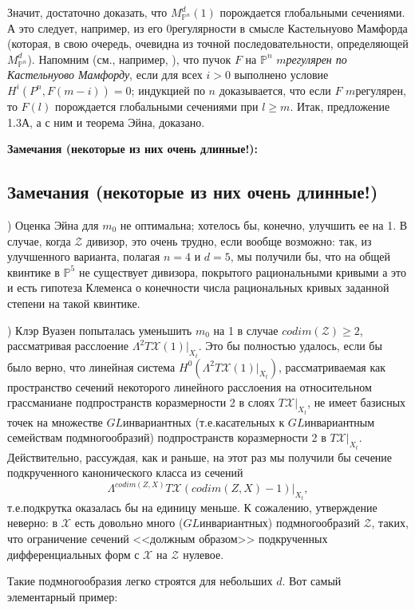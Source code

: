 Значит, достаточно доказать, что $M^d_{\mathbb{P}^n}(1)$ порождается
глобальными сечениями. А это следует, например, из его $0$регулярности
в смысле Кастельнуово Мамфорда (которая, в свою очередь, очевидна из
точной последовательности, определяющей $M^d_{\mathbb{P}^n}$). Напомним
(см., например, \cite{M}), что пучок $F$ на $\mathbb{P}^n$ \emph{$m$регулярен по
Кастельнуово Мамфорду}, если для всех $i>0$ выполнено условие
$H^i(P^n, F(m-i))=0$; индукцией по $n$ доказывается, что если $F$
$m$регулярен, то $F(l)$ порождается
глобальными сечениями при $l\geq m$. Итак, предложение 1.3А, а с ним и
теорема Эйна, доказано.


\medskip
{\bf Замечания (некоторые из них очень длинные!):}
\subsection*{Замечания (некоторые из них очень длинные!)
}

)
Оценка Эйна для $m_0$ не оптимальна; хотелось бы, конечно, улучшить ее на 1.
В случае, когда $\mathcal{Z}$ дивизор, это очень трудно, если вообще возможно:
так, из улучшенного варианта, полагая $n=4$ и $d=5$, мы получили бы, что
на общей квинтике в $\mathbb{P}^5$ не существует дивизора, покрытого рациональными
кривыми а это и есть гипотеза Клеменса о конечности числа рациональных
кривых заданной степени на такой квинтике.

)
Клэр Вуазен попыталась уменьшить $m_0$ на 1 в случае
$codim(\mathcal{Z})\geq 2$, рассматривая расслоение
$\Lambda^2T\mathcal{X}(1)|_{X_t}$. Это бы полностью удалось, если бы было
верно, что линейная система $H^0(\Lambda^2T\mathcal{X}(1)|_{X_t})$,
рассматриваемая как пространство сечений некоторого линейного расслоения
на относительном грассманиане подпространств коразмерности 2 в слоях
$T\mathcal{X}|_{X_t}$, не имеет базисных точек на множестве
$GL$инвариантных (т.е.касательных к $GL$инвариантным семействам
подмногообразий) подпространств коразмерности 2 в $T\mathcal{X}|_{X_t}$.
Действительно, рассуждая, как и раньше, на
этот раз
мы получили бы сечение подкрученного канонического класса из сечений
$$
\Lambda^{codim(Z, X)}T\mathcal{X}(codim(Z,X)-1)|_{X_t},
$$
т.е.подкрутка
оказалась бы на единицу меньше. К сожалению, утверждение неверно: в $\mathcal{X}$
есть довольно много ($GL$инвариантных) подмногообразий $\mathcal{Z}$, таких, что
ограничение сечений <<должным образом>> подкрученных дифференциальных форм
с $\mathcal{X}$ на $\mathcal{Z}$ нулевое.

Такие подмногообразия легко строятся для небольших $d$. Вот самый элементарный пример:


